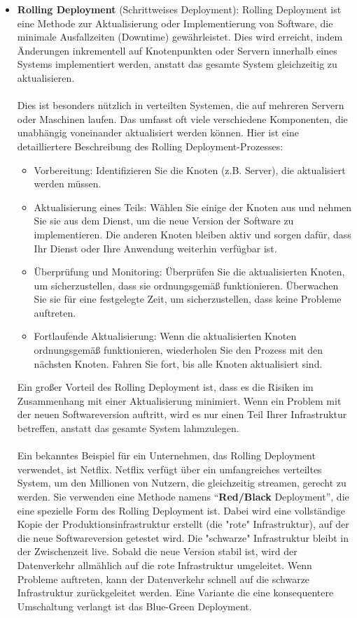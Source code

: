 \begin{itemize} 
\item \textbf{Rolling Deployment} (Schrittweises Deployment):
Rolling Deployment ist eine Methode zur Aktualisierung oder Implementierung von Software, die minimale Ausfallzeiten (Downtime) gewährleistet. Dies wird erreicht, indem Änderungen inkrementell auf Knotenpunkten oder Servern innerhalb eines Systems implementiert werden, anstatt das gesamte System gleichzeitig zu aktualisieren.
\\\\
Dies ist besonders nützlich in verteilten Systemen, die auf mehreren Servern oder Maschinen laufen. Das umfasst oft viele verschiedene Komponenten, die unabhängig voneinander aktualisiert werden können.
Hier ist eine detailliertere Beschreibung des Rolling Deployment-Prozesses:
\begin{itemize} 
\item Vorbereitung: Identifizieren Sie die Knoten (z.B. Server), die aktualisiert werden müssen.
\item Aktualisierung eines Teils: Wählen Sie einige der Knoten aus und nehmen Sie sie aus dem Dienst, um die neue Version der Software zu implementieren. Die anderen Knoten bleiben aktiv und sorgen dafür, dass Ihr Dienst oder Ihre Anwendung weiterhin verfügbar ist.
\item Überprüfung und Monitoring: Überprüfen Sie die aktualisierten Knoten, um sicherzustellen, dass sie ordnungsgemäß funktionieren. Überwachen Sie sie für eine festgelegte Zeit, um sicherzustellen, dass keine Probleme auftreten.
\item Fortlaufende Aktualisierung: Wenn die aktualisierten Knoten ordnungsgemäß funktionieren, wiederholen Sie den Prozess mit den nächsten Knoten. Fahren Sie fort, bis alle Knoten aktualisiert sind.
\end{itemize} 
Ein großer Vorteil des Rolling Deployment ist, dass es die Risiken im Zusammenhang mit einer Aktualisierung minimiert. Wenn ein Problem mit der neuen Softwareversion auftritt, wird es nur einen Teil Ihrer Infrastruktur betreffen, anstatt das gesamte System lahmzulegen.
\\\\
Ein bekanntes Beispiel für ein Unternehmen, das Rolling Deployment verwendet, ist Netflix. Netflix verfügt über ein umfangreiches verteiltes System, um den Millionen von Nutzern, die gleichzeitig streamen, gerecht zu werden. Sie verwenden eine Methode namens \enquote{\textbf{Red/Black} Deployment}, die eine spezielle Form des Rolling Deployment ist. Dabei wird eine vollständige Kopie der Produktionsinfrastruktur erstellt (die "rote" Infrastruktur), auf der die neue Softwareversion getestet wird. Die "schwarze" Infrastruktur bleibt in der Zwischenzeit live. Sobald die neue Version stabil ist, wird der Datenverkehr allmählich auf die rote Infrastruktur umgeleitet. Wenn Probleme auftreten, kann der Datenverkehr schnell auf die schwarze Infrastruktur zurückgeleitet werden. Eine Variante die eine konsequentere Umschaltung verlangt ist das Blue-Green Deployment.

\end{itemize}

